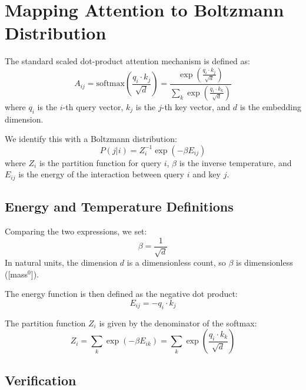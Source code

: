 
\section{Mapping Attention to Boltzmann Distribution}

The standard scaled dot-product attention mechanism is defined as:
\begin{equation}
    A_{ij} = \text{softmax} \left( \frac{q_i \cdot k_j}{\sqrt{d}} \right) = \frac{\exp \left( \frac{q_i \cdot k_j}{\sqrt{d}} \right)}{\sum_{k} \exp \left( \frac{q_i \cdot k_k}{\sqrt{d}} \right)}
\end{equation}
where $q_i$ is the $i$-th query vector, $k_j$ is the $j$-th key vector, and $d$ is the embedding dimension.

We identify this with a Boltzmann distribution:
\begin{equation}
    P(j|i) = Z_i^{-1} \exp(-\beta E_{ij})
\end{equation}
where $Z_i$ is the partition function for query $i$, $\beta$ is the inverse temperature, and $E_{ij}$ is the energy of the interaction between query $i$ and key $j$.

\subsection{Energy and Temperature Definitions}

Comparing the two expressions, we set:
\begin{equation}
    \beta = \frac{1}{\sqrt{d}}
\end{equation}
In natural units, the dimension $d$ is a dimensionless count, so $\beta$ is dimensionless ([mass$^0$]).

The energy function is then defined as the negative dot product:
\begin{equation}
    E_{ij} = -q_i \cdot k_j
\end{equation}

The partition function $Z_i$ is given by the denominator of the softmax:
\begin{equation}
    Z_i = \sum_{k} \exp(-\beta E_{ik}) = \sum_{k} \exp \left( \frac{q_i \cdot k_k}{\sqrt{d}} \right)
\end{equation}

\subsection{Verification}


